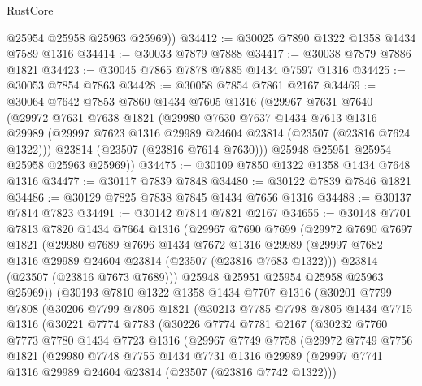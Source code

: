 \begin{lexlean}{RustCore}
\begin{coremodule}
        @25954
        @25958
        @25963
        @25969))
@34412 := @30025 @7890 @1322 @1358 @1434 @7589 @1316
@34414 := @30033 @7879 @7888
@34417 := @30038 @7879 @7886 @1821
@34423 := @30045 @7865 @7878 @7885 @1434 @7597 @1316
@34425 := @30053 @7854 @7863
@34428 := @30058 @7854 @7861 @2167
@34469 := @30064
    @7642
    @7853
    @7860
    @1434
    @7605
    @1316
    (@29967
      @7631
      @7640
      (@29972
        @7631
        @7638
        @1821
        (@29980
          @7630
          @7637
          @1434
          @7613
          @1316
          @29989
          (@29997 @7623 @1316 @29989 @24604 @23814 (@23507 (@23816 @7624 @1322)))
          @23814
          (@23507 (@23816 @7614 @7630)))
        @25948
        @25951
        @25954
        @25958
        @25963
        @25969))
@34475 := @30109 @7850 @1322 @1358 @1434 @7648 @1316
@34477 := @30117 @7839 @7848
@34480 := @30122 @7839 @7846 @1821
@34486 := @30129 @7825 @7838 @7845 @1434 @7656 @1316
@34488 := @30137 @7814 @7823
@34491 := @30142 @7814 @7821 @2167
@34655 := @30148
    @7701
    @7813
    @7820
    @1434
    @7664
    @1316
    (@29967
      @7690
      @7699
      (@29972
        @7690
        @7697
        @1821
        (@29980
          @7689
          @7696
          @1434
          @7672
          @1316
          @29989
          (@29997 @7682 @1316 @29989 @24604 @23814 (@23507 (@23816 @7683 @1322)))
          @23814
          (@23507 (@23816 @7673 @7689)))
        @25948
        @25951
        @25954
        @25958
        @25963
        @25969))
    (@30193
      @7810
      @1322
      @1358
      @1434
      @7707
      @1316
      (@30201
        @7799
        @7808
        (@30206
          @7799
          @7806
          @1821
          (@30213
            @7785
            @7798
            @7805
            @1434
            @7715
            @1316
            (@30221
              @7774
              @7783
              (@30226
                @7774
                @7781
                @2167
                (@30232
                  @7760
                  @7773
                  @7780
                  @1434
                  @7723
                  @1316
                  (@29967
                    @7749
                    @7758
                    (@29972
                      @7749
                      @7756
                      @1821
                      (@29980
                        @7748
                        @7755
                        @1434
                        @7731
                        @1316
                        @29989
                        (@29997 @7741 @1316 @29989 @24604 @23814 (@23507 (@23816 @7742 @1322)))

\end{coremodule}
\end{lexlean}
